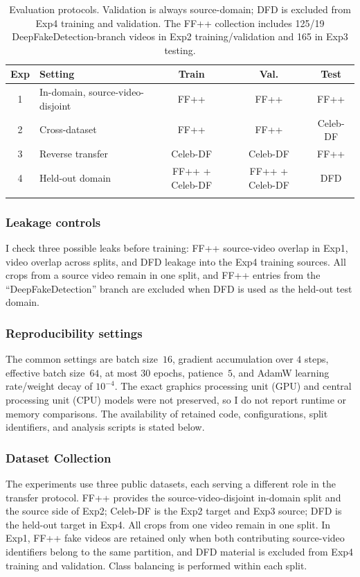\documentclass[pdflatex,sn-mathphys-num,iicol]{sn-jnl}
\begin{document}
\begin{table}[!htbp]
\caption{Evaluation protocols. Validation is always source-domain; DFD is excluded from Exp4 training and validation. The FF++ collection includes 125/19 DeepFakeDetection-branch videos in Exp2 training/validation and 165 in Exp3 testing.}
\centering
\scriptsize
\setlength{\tabcolsep}{3pt}
\begin{tabular}{c l c c c}
\toprule
\textbf{Exp} & \textbf{Setting} & \textbf{Train} & \textbf{Val.} & \textbf{Test} \\
\midrule
1 & In-domain, source-video-disjoint & FF++ & FF++ & FF++ \\
2 & Cross-dataset & FF++ & FF++ & Celeb-DF \\
3 & Reverse transfer & Celeb-DF & Celeb-DF & FF++ \\
4 & Held-out domain & FF++ + Celeb-DF & FF++ + Celeb-DF & DFD \\
\botrule
\end{tabular}
\label{tab:experiment_protocol}
\end{table}


\subsubsection{Leakage controls}
I check three possible leaks before training: FF++ source-video overlap in Exp1, video overlap across splits, and DFD leakage into the Exp4 training sources. All crops from a source video remain in one split, and FF++ entries from the ``DeepFakeDetection'' branch are excluded when DFD is used as the held-out test domain.

\subsubsection{Reproducibility settings}
The common settings are batch size~$16$, gradient accumulation over $4$ steps, effective batch size~$64$, at most $30$ epochs, patience~$5$, and AdamW learning rate/weight decay of $10^{-4}$. The exact graphics processing unit (GPU) and central processing unit (CPU) models were not preserved, so I do not report runtime or memory comparisons. The availability of retained code, configurations, split identifiers, and analysis scripts is stated below.


\subsubsection{Dataset Collection}
The experiments use three public datasets, each serving a different role in the transfer protocol. FF++ provides the source-video-disjoint in-domain split and the source side of Exp2; Celeb-DF is the Exp2 target and Exp3 source; DFD is the held-out target in Exp4. All crops from one video remain in one split. In Exp1, FF++ fake videos are retained only when both contributing source-video identifiers belong to the same partition, and DFD material is excluded from Exp4 training and validation. Class balancing is performed within each split.
\end{document}
